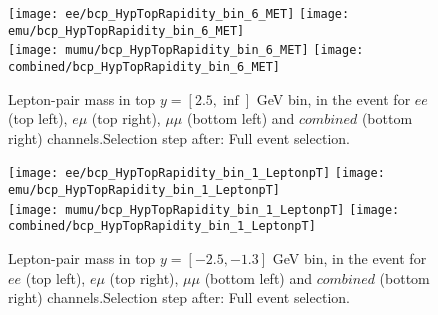 \documentclass[12pt, a4paper, titlepage]{article}
\begin{document}
\clearpage
\newpage
\begin{figure}
  \texttt{[image: ee/bcp\_HypTopRapidity\_bin\_6\_MET]}
  \texttt{[image: emu/bcp\_HypTopRapidity\_bin\_6\_MET]}\\
  \texttt{[image: mumu/bcp\_HypTopRapidity\_bin\_6\_MET]}
  \texttt{[image: combined/bcp\_HypTopRapidity\_bin\_6\_MET]}
\caption{Lepton-pair mass in top $y = [2.5,\inf]$ GeV bin, in the event for $ee$ (top left), $e\mu$ (top right), $\mu\mu$ (bottom left) and $combined$ (bottom right) channels.\newline Selection step after: Full event selection.}
\end{figure}

\clearpage
\newpage










% 
% 

\begin{figure}
  \texttt{[image: ee/bcp\_HypTopRapidity\_bin\_1\_LeptonpT]}
  \texttt{[image: emu/bcp\_HypTopRapidity\_bin\_1\_LeptonpT]}\\
  \texttt{[image: mumu/bcp\_HypTopRapidity\_bin\_1\_LeptonpT]}
  \texttt{[image: combined/bcp\_HypTopRapidity\_bin\_1\_LeptonpT]}
\caption{Lepton-pair mass in top $y = [-2.5,-1.3]$ GeV bin, in the event for $ee$ (top left), $e\mu$ (top right), $\mu\mu$ (bottom left) and $combined$ (bottom right) channels.\newline Selection step after: Full event selection.}
\end{figure}
\end{document}
